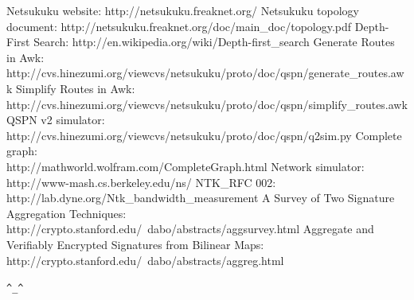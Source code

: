\documentclass[a4paper]{article}
\newcommand{\href}[2]{ #1 }
\begin{document}
\begin{thebibliography}{99}
	 Netsukuku website:
		\href{http://netsukuku.freaknet.org/}{http://netsukuku.freaknet.org/}
	 Netsukuku topology document:
		\href{http://netsukuku.freaknet.org/doc/main\_doc/topology.pdf}{topology.pdf}
	 Depth-First Search:
		\href{http://en.wikipedia.org/wiki/Depth-first\_search}{http://en.wikipedia.org/wiki/Depth-first\_search}
	 Generate Routes in Awk:
		\ifpdf \else \\ \fi
		\href{http://cvs.hinezumi.org/viewcvs/netsukuku/proto/doc/qspn/generate\_routes.awk}{generate\_routes.awk}
	 Simplify Routes in Awk:
		\ifpdf \else \\ \fi
		\href{http://cvs.hinezumi.org/viewcvs/netsukuku/proto/doc/qspn/simplify\_routes.awk}{simplify\_routes.awk}
	 QSPN v2 simulator:
		\ifpdf \else \\ \fi
		\href{http://cvs.hinezumi.org/viewcvs/netsukuku/proto/doc/qspn/q2sim.py}{q2sim.py}
	 Complete graph:
		\ifpdf \else \\ \fi
		\href{http://mathworld.wolfram.com/CompleteGraph.html}{http://mathworld.wolfram.com/}
	 Network simulator:
		\ifpdf \else \\ \fi
		\href{http://www-mash.cs.berkeley.edu/ns/}{http://www-mash.cs.berkeley.edu/ns/}
	 NTK\_RFC 002:
		\href{http://lab.dyne.org/Ntk\_bandwidth\_measurement}{Bandwidth
		measurement}
	   A Survey of Two Signature Aggregation
		Techniques:
		\ifpdf \else \\ \fi
		\href{http://crypto.stanford.edu/~dabo/abstracts/aggsurvey.html}{http://crypto.stanford.edu/~dabo/abstracts/aggsurvey.html}
	  Aggregate and Verifiably Encrypted Signatures
		from Bilinear Maps:
		\ifpdf \else \\ \fi
		\href{http://crypto.stanford.edu/~dabo/abstracts/aggreg.html}{http://crypto.stanford.edu/~dabo/abstracts/aggreg.html}

\end{thebibliography}
\newpage

\begin{center}
\verb|^_^|
\end{center}
\end{document}
